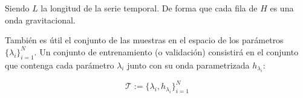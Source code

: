 Siendo $L$ la longitud de la serie temporal. De forma que cada fila de $H$ es una onda gravitacional.

También es útil el conjunto de las muestras en el espacio de los parámetros
$\{ \lambda_i \}_{i=1}^N$. 
Un conjunto de entrenamiento (o validación) consistirá en el conjunto que contenga cada parámetro $\lambda_i$ junto con su onda parametrizada $h_{\lambda_i}$:

\[
\mathcal{T} := \{ \lambda_i, h_{\lambda_i} \}_{i=1}^N
\]



